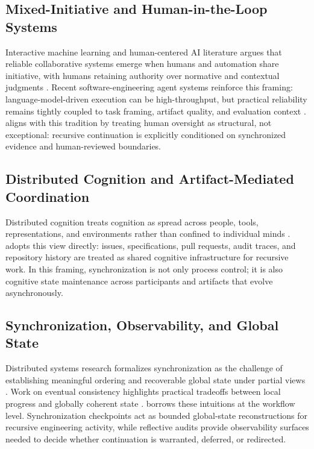 \subsection{Mixed-Initiative and Human-in-the-Loop Systems}

Interactive machine learning and human-centered AI literature argues that reliable collaborative systems emerge when humans and automation share initiative, with humans retaining authority over normative and contextual judgments \cite{Amershi2014InteractiveML,Shneiderman2020HCAI}. Recent software-engineering agent systems reinforce this framing: language-model-driven execution can be high-throughput, but practical reliability remains tightly coupled to task framing, artifact quality, and evaluation context \cite{Chen2021Codex,Jimenez2024SWEBench,Yang2024SWEAgent}.  aligns with this tradition by treating human oversight as structural, not exceptional: recursive continuation is explicitly conditioned on synchronized evidence and human-reviewed boundaries.

\subsection{Distributed Cognition and Artifact-Mediated Coordination}

Distributed cognition treats cognition as spread across people, tools, representations, and environments rather than confined to individual minds \cite{Hutchins1995CognitionWild}.  adopts this view directly: issues, specifications, pull requests, audit traces, and repository history are treated as shared cognitive infrastructure for recursive work. In this framing, synchronization is not only process control; it is also cognitive state maintenance across participants and artifacts that evolve asynchronously.

\subsection{Synchronization, Observability, and Global State}

Distributed systems research formalizes synchronization as the challenge of establishing meaningful ordering and recoverable global state under partial views \cite{Lamport1978TimeClocks,Chandy1985DistributedSnapshots}. Work on eventual consistency highlights practical tradeoffs between local progress and globally coherent state \cite{Vogels2009EventuallyConsistent}.  borrows these intuitions at the workflow level. Synchronization checkpoints act as bounded global-state reconstructions for recursive engineering activity, while reflective audits provide observability surfaces needed to decide whether continuation is warranted, deferred, or redirected.

